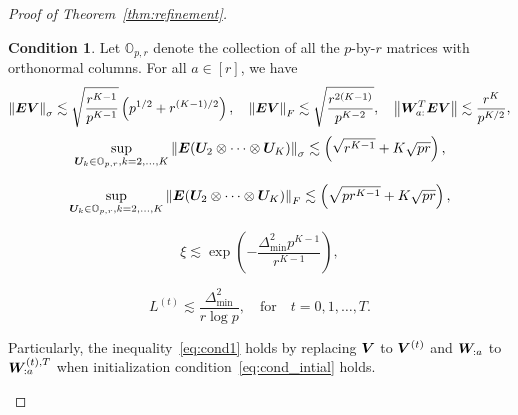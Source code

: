 \documentclass[lettersize,onecolumn,journal]{IEEEtran}
\theoremstyle{definition}
\theoremstyle{definition}
\newtheorem{condition}{Condition}
\newcommand{\of}[1]{\left(#1\right)}
\def\fixme#1#2{\textbf{\color{red}[FIXME (#1): #2]}}
\begin{document}
\begin{proof}[Proof of Theorem~\ref{thm:refinement}]
\begin{condition}\label{cond:origin} Let $\mathbb{O}_{p, r}$ denote the collection of all the $p$-by-$r$ matrices with orthonormal columns. For all $a \in [r]$, we have 
\begin{equation}\label{eq:cond1}
    \onorm{\mE \mV}_\sigma \lesssim \sqrt{\frac{r^{K-1}}{p^{K-1}}} \of{ p ^{1/2}+ r^{(K-1)/2}}, \quad \onorm{\mE \mV}_F \lesssim \sqrt{\frac{ r^{2(K-1)}}{p^{K-2}}},\quad \onorm{ \mW_{a:}^T \mE \mV} \lesssim \frac{r^K}{p^{K/2}},
\end{equation}
\begin{equation}\label{eq:cond2}
    \sup_{ \mU_k \in \mathbb{O}_{p, r}, k = 2,\ldots, K } \onorm{ \mE (\mU_{2} \otimes \cdots \otimes \mU_K)}_\sigma \lesssim \of{ \sqrt{r^{K-1}} + K\sqrt{pr}},
\end{equation}

\begin{equation}\label{eq:cond3}
    \sup_{ \mU_k \in \mathbb{O}_{p, r}, k = 2,\ldots, K } \onorm{ \mE (\mU_{2} \otimes \cdots \otimes \mU_K)}_F \lesssim \of{ \sqrt{pr^{K-1}} + K\sqrt{pr}},
\end{equation}

\begin{equation}\label{eq:cond_oracle}
    \xi \lesssim \exp\of{ - \frac{\Delta_{\min}^2 p^{K-1}}{r^{K-1}}},
\end{equation}



\begin{equation}\label{eq:cond_intial}
    L^{(t)} \lesssim \frac{\Delta_{\min}^2}{r \log p}, \quad \text{for} \quad t = 0, 1, \ldots, T.
\end{equation}
 
 Particularly, the inequality~\eqref{eq:cond1} holds by replacing $\bm{V}$ to $\bm{V}^{(t)}$ and $\bm{W}_{:a}$ to $\bm{W}_{:a}^{(t),T}$ when initialization condition~\eqref{eq:cond_intial} holds.
\end{condition}



\end{proof}
\end{document}

